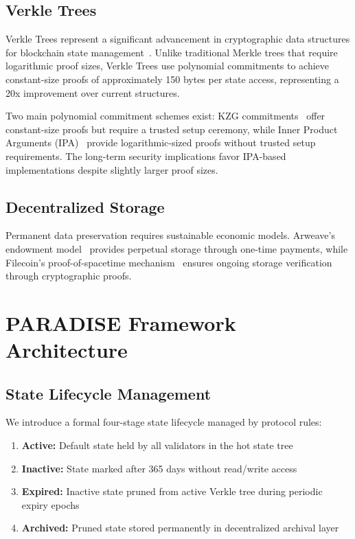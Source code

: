 \documentclass{article}
\begin{document}
\subsection{Verkle Trees}

Verkle Trees represent a significant advancement in cryptographic data structures for blockchain state management~\cite{kuszmaul2018,buterin2021verkle}. Unlike traditional Merkle trees that require logarithmic proof sizes, Verkle Trees use polynomial commitments to achieve constant-size proofs of approximately 150 bytes per state access, representing a 20x improvement over current structures.

Two main polynomial commitment schemes exist: KZG commitments~\cite{kzg2010} offer constant-size proofs but require a trusted setup ceremony, while Inner Product Arguments (IPA)~\cite{bunz2018bulletproofs} provide logarithmic-sized proofs without trusted setup requirements. The long-term security implications favor IPA-based implementations despite slightly larger proof sizes.

\subsection{Decentralized Storage}

Permanent data preservation requires sustainable economic models. Arweave's endowment model~\cite{williams2018arweave} provides perpetual storage through one-time payments, while Filecoin's proof-of-spacetime mechanism~\cite{protocollabs2017filecoin} ensures ongoing storage verification through cryptographic proofs.

\section{PARADISE Framework Architecture}

\subsection{State Lifecycle Management}

We introduce a formal four-stage state lifecycle managed by protocol rules:

\begin{enumerate}
\item \textbf{Active:} Default state held by all validators in the hot state tree
\item \textbf{Inactive:} State marked after 365 days without read/write access
\item \textbf{Expired:} Inactive state pruned from active Verkle tree during periodic expiry epochs
\item \textbf{Archived:} Pruned state stored permanently in decentralized archival layer
\end{enumerate}
\end{document}
